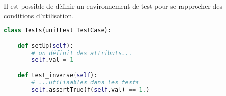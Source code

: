 \documentclass[svgnames,11pt]{beamer}
\begin{document}
\begin{frame}[fragile]
    \frametitle{}

    Il est possible de définir un environnement de test pour se rapprocher des conditions d'utilisation.
    \begin{center}
        \begin{lstlisting}[language=Python , basicstyle=\ttfamily\small, xleftmargin=2em, xrightmargin=2em]
class Tests(unittest.TestCase):

    def setUp(self):
        # on définit des attributs...
        self.val = 1

    def test_inverse(self):
        # ...utilisables dans les tests
        self.assertTrue(f(self.val) == 1.)
\end{lstlisting}
    \end{center}

\end{frame}
\end{document}
